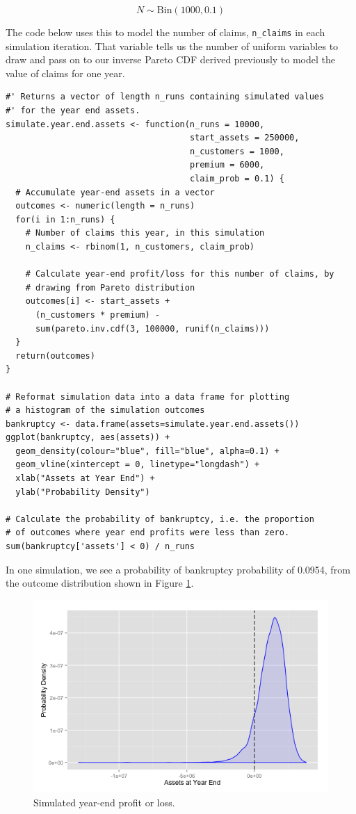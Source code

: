 \documentclass{article}
\begin{document}
\[
  N \sim \mathrm{Bin}(1000, 0.1)
\]

The code below uses this to model the number of claims,
\texttt{n\_claims} in each simulation iteration. That variable tells us
the number of uniform variables to draw and pass on to our inverse
Pareto CDF derived previously to model the value of claims for one year.

\begin{verbatim}
#' Returns a vector of length n_runs containing simulated values
#' for the year end assets.
simulate.year.end.assets <- function(n_runs = 10000,
                                     start_assets = 250000,
                                     n_customers = 1000,
                                     premium = 6000,
                                     claim_prob = 0.1) {
  # Accumulate year-end assets in a vector
  outcomes <- numeric(length = n_runs)
  for(i in 1:n_runs) {
    # Number of claims this year, in this simulation
    n_claims <- rbinom(1, n_customers, claim_prob)

    # Calculate year-end profit/loss for this number of claims, by
    # drawing from Pareto distribution
    outcomes[i] <- start_assets +
      (n_customers * premium) -
      sum(pareto.inv.cdf(3, 100000, runif(n_claims)))
  }
  return(outcomes)
}

# Reformat simulation data into a data frame for plotting
# a histogram of the simulation outcomes
bankruptcy <- data.frame(assets=simulate.year.end.assets())
ggplot(bankruptcy, aes(assets)) +
  geom_density(colour="blue", fill="blue", alpha=0.1) +
  geom_vline(xintercept = 0, linetype="longdash") +
  xlab("Assets at Year End") +
  ylab("Probability Density")

# Calculate the probability of bankruptcy, i.e. the proportion
# of outcomes where year end profits were less than zero.
sum(bankruptcy['assets'] < 0) / n_runs
\end{verbatim}

In one simulation, we see a probability of bankruptcy probability of
0.0954, from the outcome distribution shown in Figure
\ref{fig:q2_histogram}.

\begin{figure}
  \includegraphics[width=\textwidth]{q2_histogram}
  \caption{Simulated year-end profit or loss.}
  \centering
\label{fig:q2_histogram}
\end{figure}
\end{document}

